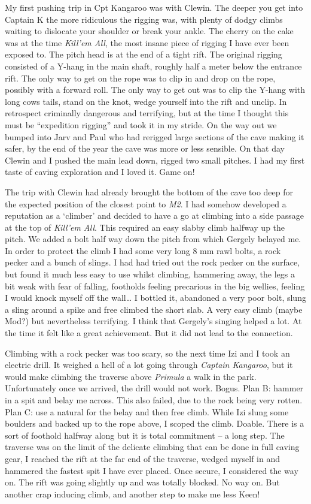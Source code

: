 My first pushing trip in Cpt Kangaroo was with Clewin. The deeper you
get into Captain K the more ridiculous the rigging was, with plenty of
dodgy climbs waiting to dislocate your shoulder or break your ankle. The
cherry on the cake was at the time \emph{Kill'em All}, the most insane
piece of rigging I have ever been exposed to. The pitch head is at the
end of a tight rift. The original rigging consisted of a Y-hang in the
main shaft, roughly half a meter below the entrance rift. The only way
to get on the rope was to clip in and drop on the rope, possibly with a
forward roll. The only way to get out was to clip the Y-hang with long
cows tails, stand on the knot, wedge yourself into the rift and unclip.
In retrospect criminally dangerous and terrifying, but at the time I
thought this must be ``expedition rigging'' and took it in my stride. On
the way out we bumped into Jarv and Paul who had rerigged large sections
of the cave making it safer, by the end of the year the cave was more or
less sensible. On that day Clewin and I pushed the main lead down,
rigged two small pitches. I had my first taste of caving exploration and
I loved it. Game on!

The trip with Clewin had already brought the bottom of the cave too deep
for the expected position of the closest point to \emph{M2}. I had
somehow developed a reputation as a `climber' and decided to have a go
at climbing into a side passage at the top of \emph{Kill'em All}. This
required an easy slabby climb halfway up the pitch. We added a bolt half
way down the pitch from which Gergely belayed me. In order to protect
the climb I had some very long 8 mm rawl bolts, a rock pecker and a
bunch of slings. I had had tried out the rock pecker on the surface, but
found it much less easy to use whilst climbing, hammering away, the legs
a bit weak with fear of falling, footholds feeling precarious in the big
wellies, feeling I would knock myself off the wall\ldots{} I bottled it,
abandoned a very poor bolt, slung a sling around a spike and free
climbed the short slab. A very easy climb (maybe Mod?) but nevertheless
terrifying. I think that Gergely's singing helped a lot. At the time it
felt like a great achievement. But it did not lead to the connection.

Climbing with a rock pecker was too scary, so the next time Izi and I
took an electric drill. It weighed a hell of a lot going through
\emph{Captain Kangaroo}, but it would make climbing the traverse above
\emph{Primula} a walk in the park. Unfortunately once we arrived, the
drill would not work. Bogus. Plan B: hammer in a spit and belay me
across. This also failed, due to the rock being very rotten. Plan C: use
a natural for the belay and then free climb. While Izi slung some
boulders and backed up to the rope above, I scoped the climb. Doable.
There is a sort of foothold halfway along but it is total commitment --
a long step. The traverse was on the limit of the delicate climbing that
can be done in full caving gear, I reached the rift at the far end of
the traverse, wedged myself in and hammered the fastest spit I have ever
placed. Once secure, I considered the way on. The rift was going
slightly up and was totally blocked. No way on. But another crap
inducing climb, and another step to make me less Keen!

